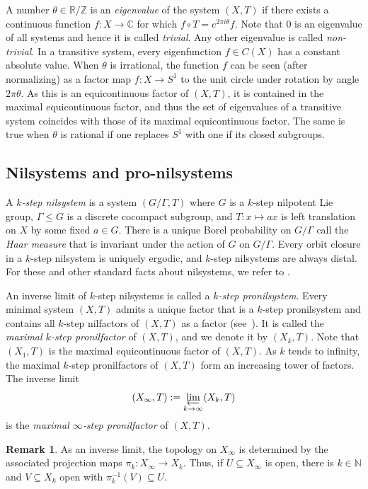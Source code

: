 \documentclass{article}
\theoremstyle{plain}
\theoremstyle{claim}
\theoremstyle{definition}
\newtheorem{remark}[Theorem]{Remark}
\theoremstyle{plain}
\theoremstyle{plain}
\newcommand{\N}{\mathbb{N}}
\newcommand{\Z}{\mathbb{Z}}
\newcommand{\R}{\mathbb{R}}
\newcommand{\C}{\mathbb{C}}
\renewcommand{\leq}{\leqslant}
\newcommand{\1}{\boldsymbol{1}}
\begin{document}
A number $\theta \in \R/\Z$ is an \emph{eigenvalue} of the system $(X,T)$ if there exists a continuous function $f: X \to \C$ for which $f \circ T = e^{2\pi i \theta}f$.  
Note that $0$ is an eigenvalue of all systems and hence it is called \emph{trivial}. Any other eigenvalue is called \emph{non-trivial}.
In a transitive system, every eigenfunction $f\in C(X)$ has a constant absolute value.
When $\theta$ is irrational, the function $f$ can be seen (after normalizing) as a factor map $f:X\to S^1$ to the unit circle under rotation by angle $2\pi\theta$. As this is an equicontinuous factor of $(X,T)$, it is contained in the maximal equicontinuous factor, and thus the set of eigenvalues of a transitive system coincides with those of its maximal equicontinuous factor.
The same is true when $\theta$ is rational if one replaces $S^1$ with one if its closed subgroups.



\subsection{Nilsystems and pro-nilsystems}
\label{sec_prelims_nil}

A \emph{$k$-step nilsystem} is a system $(G/\Gamma,T)$ where $G$ is a $k$-step nilpotent Lie group, $\Gamma\leq G$ is a discrete cocompact subgroup, and $T:x\mapsto ax$ is left translation on $X$ by some fixed $a\in G$.
There is a unique Borel probability on $G/\Gamma$ call the \emph{Haar measure} that is invariant under the action of $G$ on $G/\Gamma$. Every orbit closure in a $k$-step nilsystem is uniquely ergodic, and $k$-step nilsystems are always distal. For these and other standard facts about nilsystems, we refer to \cite{Host_Kra18}. 


An inverse limit of $k$-step nilsystems is called a \emph{$k$-step pronilsystem}. Every minimal system $(X,T)$ admits a unique factor that is a $k$-step pronilsystem and contains all $k$-step nilfactors of $(X,T)$ as a factor (see~\cite[Chapter 17]{Host_Kra18}). It is called the \emph{maximal $k$‑step pronilfactor} of $(X,T)$, and we denote it by $(X_k,T)$. Note that $(X_1,T)$ is the maximal equicontinuous factor of $(X,T)$.  As $k$ tends to infinity, the maximal $k$‑step pronilfactors of $(X,T)$ form an increasing tower of factors. The inverse limit
\[
(X_\infty,T):=\varprojlim_{k\to\infty} (X_k,T)
\]
is the \emph{maximal $\infty$‑step pronilfactor} of $(X,T)$.

\begin{remark}
\label{rmk_open_set_in_an_inverse_limit}
As an inverse limit, the topology on $X_\infty$ is determined by the associated projection maps $\pi_k : X_\infty \to X_k$. Thus, if $U \subseteq X_\infty$ is open, there is $k \in \N$ and $V \subseteq X_k$ open with $\pi_k^{-1}(V) \subseteq U$.
\end{remark}
\end{document}
